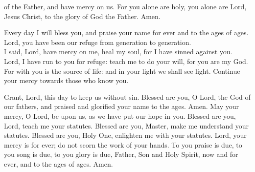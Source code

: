\documentclass{article}
\begin{document}
\begin{service}
\begin{multicols}{2}
{			of the Father, and have mercy on us. For you alone are holy, you alone are
			Lord, Jesus Christ, to the glory of God the Father. Amen.
			\item Every day I will bless you, and praise your name for ever and to the ages of
			ages. Lord, you have been our refuge from generation to generation.\\I said,
			Lord, have mercy on me, heal my soul, for I have sinned against you. Lord, I
			have run to you for refuge: teach me to do your will, for you are my God. For
			with you is the source of life: and in your light we shall see light. Continue
			your mercy towards those who know you.
			\item Grant, Lord, this day to keep us without sin. Blessed are you, O Lord, the God
			of our fathers, and praised and glorified your name to the ages. Amen. May
			your mercy, O Lord, be upon us, as we have put our hope in you. Blessed are
			you, Lord, teach me your statutes. Blessed are you, Master, make me understand
			your statutes. Blessed are you, Holy One, enlighten me with your statutes.
			Lord, your mercy is for ever; do not scorn the work of your hands. To
			you praise is due, to you song is due, to you glory is due, Father, Son and
			Holy Spirit, now and for ever, and to the ages of ages. Amen.
		}
	\end{multicols}
	\rest
\end{service}
\end{document}
